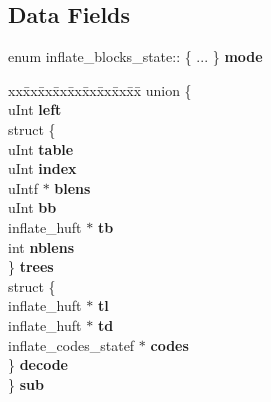 \subsection*{Data Fields}
\begin{DoxyCompactItemize}
\item 
\mbox{\label{structinflate__blocks__state_ab91bec5269be86a053ebc89e45718a0e}} 
enum inflate\+\_\+blocks\+\_\+state\+:: \{ ... \}  {\bfseries mode}
\item 
\mbox{\label{structinflate__blocks__state_a67da531da4c9c70af826909d00c09f24}} 
\begin{tabbing}
xx\=xx\=xx\=xx\=xx\=xx\=xx\=xx\=xx\=\kill
union \{\\
\>uInt {\bfseries left}\\
\>struct \{\\
\>\>uInt {\bfseries table}\\
\>\>uInt {\bfseries index}\\
\>\>uIntf $\ast$ {\bfseries blens}\\
\>\>uInt {\bfseries bb}\\
\>\>inflate\_huft $\ast$ {\bfseries tb}\\
\>\>int {\bfseries nblens}\\
\>\} {\bfseries trees}\\
\>struct \{\\
\>\>inflate\_huft $\ast$ {\bfseries tl}\\
\>\>inflate\_huft $\ast$ {\bfseries td}\\
\>\>inflate\_codes\_statef $\ast$ {\bfseries codes}\\
\>\} {\bfseries decode}\\
\} {\bfseries sub}\\


\end{tabbing}
\end{DoxyCompactItemize}

